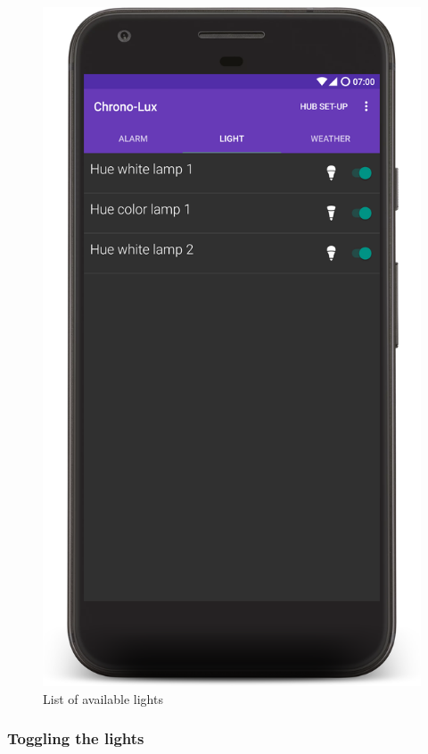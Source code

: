 \begin{figure}[H]
  \centering
  \includegraphics[scale=0.1]{Images/lightList.png}
  \caption{List of available lights}
  \label{fig:lightList}
\end{figure}

\subsubsection{Toggling the lights}\label{toggling-the-lights}

